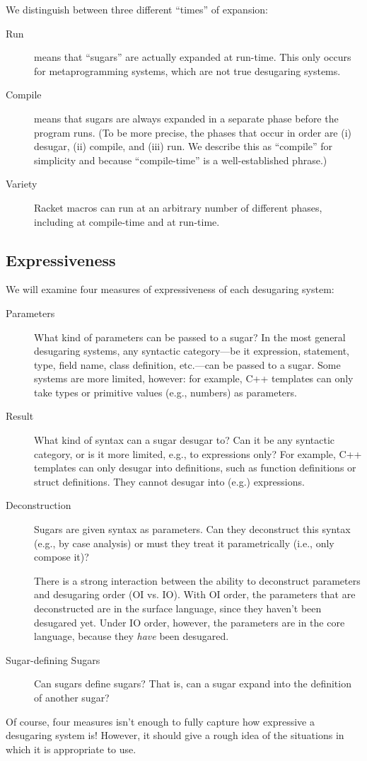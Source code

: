 We distinguish between three different ``times'' of expansion:
\begin{description}
\item[Run] means that ``sugars'' are actually expanded at run-time.
  This only occurs for metaprogramming systems, which are not true
  desugaring systems.
\item[Compile] means that sugars are always expanded in a separate
  phase before the program runs. (To be more precise, the phases that
  occur in order are (i) desugar, (ii) compile, and (iii) run. We
  describe this as ``compile'' for simplicity and because
  ``compile-time'' is a well-established phrase.)
\item[Variety] Racket macros can run at an arbitrary number of different
  phases, including at compile-time and at run-time.
\end{description}

\subsection{Expressiveness}

We will examine four measures of expressiveness of each desugaring
system:
\begin{description}
\item[Parameters] What kind of parameters can be passed to a sugar? In
  the most general desugaring systems, any syntactic category---be it
  expression, statement, type, field name, class definition,
  etc.---can be passed to a sugar. Some systems are more limited,
  however: for example, C++ templates can only take types or primitive
  values (e.g., numbers) as parameters.
\item[Result] What kind of syntax can a sugar desugar to? Can it be
  any syntactic category, or is it more limited, e.g., to expressions
  only? For example, C++ templates can only desugar into definitions,
  such as function definitions or struct definitions. They cannot
  desugar into (e.g.) expressions.
\item[Deconstruction] Sugars are given syntax as parameters. Can they
  deconstruct this syntax (e.g., by case analysis) or must
  they treat it parametrically (i.e., only compose it)?

  There is a strong interaction between the ability to deconstruct
  parameters and desugaring order (OI vs. IO). With OI order, the
  parameters that are deconstructed are in the surface language, since
  they haven't been desugared yet. Under IO order, however, the
  parameters are in the core language, because they \emph{have} been
  desugared.
\item[Sugar-defining Sugars] Can sugars define sugars? That is, can a
  sugar expand into the definition of another sugar?
\end{description}
Of course, four measures isn't enough to fully capture how expressive
a desugaring system is! However, it should give a rough idea of the
situations in which it is appropriate to use.


